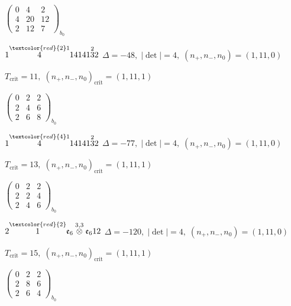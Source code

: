 \documentclass[10pt]{article}
\begin{document}
\hspace{2em}$\left(\begin{smallmatrix}0 & 4 & 2 \\ 4 & 20 & 12 \\ 2 & 12 & 7\end{smallmatrix}\right)_{\!b_0}$

\smallskip

$1\overset{\textcolor{red}{2}1}{4}14141\overset{2}{3}2$ \quad $\Delta=-48,\; |\det|=4,\; (n_+,n_-,n_0)=(1,11,0)$

\hspace{1em}$T_{\text{crit}}=11,\; (n_+,n_-,n_0)_{\text{crit}}=(1,11,1)$

\hspace{2em}$\left(\begin{smallmatrix}0 & 2 & 2 \\ 2 & 4 & 6 \\ 2 & 6 & 8\end{smallmatrix}\right)_{\!b_0}$

$1\overset{\textcolor{red}{4}1}{4}14141\overset{2}{3}2$ \quad $\Delta=-77,\; |\det|=4,\; (n_+,n_-,n_0)=(1,11,0)$

\hspace{1em}$T_{\text{crit}}=13,\; (n_+,n_-,n_0)_{\text{crit}}=(1,11,1)$

\hspace{2em}$\left(\begin{smallmatrix}0 & 2 & 2 \\ 2 & 2 & 4 \\ 2 & 4 & 6\end{smallmatrix}\right)_{\!b_0}$

\smallskip

$2\overset{\textcolor{red}{2}}{1}\mathfrak{e}_6\overset{3,3}{\otimes}\mathfrak{e}_612$ \quad $\Delta=-120,\; |\det|=4,\; (n_+,n_-,n_0)=(1,11,0)$

\hspace{1em}$T_{\text{crit}}=15,\; (n_+,n_-,n_0)_{\text{crit}}=(1,11,1)$

\hspace{2em}$\left(\begin{smallmatrix}0 & 2 & 2 \\ 2 & 8 & 6 \\ 2 & 6 & 4\end{smallmatrix}\right)_{\!b_0}$
\end{document}
